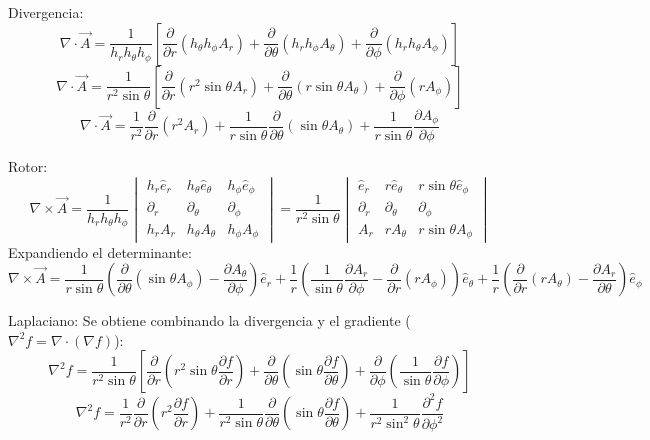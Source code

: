 \documentclass[11pt,spanish]{article}
\begin{document}
\begin{itemize}
Divergencia:
$$
\nabla \cdot \vec{A} = \frac{1}{h_r h_\theta h_\phi} \left[ \frac{\partial}{\partial r}(h_\theta h_\phi A_r) + \frac{\partial}{\partial \theta}(h_r h_\phi A_\theta) + \frac{\partial}{\partial \phi}(h_r h_\theta A_\phi) \right]
$$
$$
\nabla \cdot \vec{A} = \frac{1}{r^2\sin\theta} \left[ \frac{\partial}{\partial r}(r^2\sin\theta A_r) + \frac{\partial}{\partial \theta}(r\sin\theta A_\theta) + \frac{\partial}{\partial \phi}(r A_\phi) \right]
$$
$$
\nabla \cdot \vec{A} = \frac{1}{r^2} \frac{\partial}{\partial r}(r^2 A_r) + \frac{1}{r\sin\theta} \frac{\partial}{\partial \theta}(\sin\theta A_\theta) + \frac{1}{r\sin\theta} \frac{\partial A_\phi}{\partial \phi}
$$

Rotor:
$$
\nabla \times \vec{A} = \frac{1}{h_r h_\theta h_\phi} \begin{vmatrix} h_r \hat{e}_r & h_\theta \hat{e}_\theta & h_\phi \hat{e}_\phi \\ \partial_r & \partial_\theta & \partial_\phi \\ h_r A_r & h_\theta A_\theta & h_\phi A_\phi \end{vmatrix} = \frac{1}{r^2\sin\theta} \begin{vmatrix} \hat{e}_r & r \hat{e}_\theta & r\sin\theta \hat{e}_\phi \\ \partial_r & \partial_\theta & \partial_\phi \\ A_r & r A_\theta & r\sin\theta A_\phi \end{vmatrix}
$$
Expandiendo el determinante:
$$
\nabla \times \vec{A} = \frac{1}{r\sin\theta} \left( \frac{\partial}{\partial \theta}(\sin\theta A_\phi) - \frac{\partial A_\theta}{\partial \phi} \right) \hat{e}_r + \frac{1}{r} \left( \frac{1}{\sin\theta}\frac{\partial A_r}{\partial \phi} - \frac{\partial}{\partial r}(r A_\phi) \right) \hat{e}_\theta + \frac{1}{r} \left( \frac{\partial}{\partial r}(r A_\theta) - \frac{\partial A_r}{\partial \theta} \right) \hat{e}_\phi
$$

Laplaciano:
Se obtiene combinando la divergencia y el gradiente ($\nabla^2 f = \nabla \cdot (\nabla f)$):
$$
\nabla^2 f = \frac{1}{r^2\sin\theta} \left[ \frac{\partial}{\partial r}\left(r^2\sin\theta \frac{\partial f}{\partial r}\right) + \frac{\partial}{\partial \theta}\left(\sin\theta \frac{\partial f}{\partial \theta}\right) + \frac{\partial}{\partial \phi}\left(\frac{1}{\sin\theta} \frac{\partial f}{\partial \phi}\right) \right]
$$
$$
\nabla^2 f = \frac{1}{r^2} \frac{\partial}{\partial r}\left(r^2 \frac{\partial f}{\partial r}\right) + \frac{1}{r^2\sin\theta} \frac{\partial}{\partial \theta}\left(\sin\theta \frac{\partial f}{\partial \theta}\right) + \frac{1}{r^2\sin^2\theta} \frac{\partial^2 f}{\partial \phi^2}
$$
\end{itemize}
\end{document}
